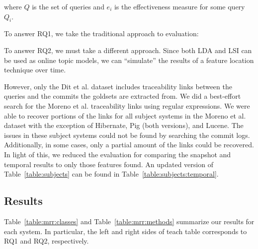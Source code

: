 where $Q$ is the set of queries
and $e_i$ is the effectiveness measure for some query $Q_i$.

To answer RQ1, we take the traditional approach to evaluation:

To answer RQ2, we must take a different approach.
Since both LDA and LSI can be used as online topic models, we can
``simulate'' the results of a feature location technique over time.

However, only the Dit et al. dataset includes traceability links between
the queries and the commits the goldsets are extracted from.
We did a best-effort search for the Moreno et al. traceability links
using regular expressions.
We were able to recover portions of the links for all subject systems in
the Moreno et al. dataset with the exception of Hibernate, Pig (both versions), and Lucene.
The issues in these subject systems could not be found by searching the commit logs.
Additionally, in some cases, only a partial amount of the links could be
recovered. In light of this, we reduced the evaluation for comparing the
snapshot and temporal results to only those features found.
An updated version of Table~\ref{table:subjects} can be found in Table~\ref{table:subjects:temporal}.


\subsection{Results}

Table~\ref{table:mrr:classes} and Table~\ref{table:mrr:methods}
summarize our results for each system.
In particular, the left and right sides of teach table corresponds to RQ1 and RQ2, respectively.


